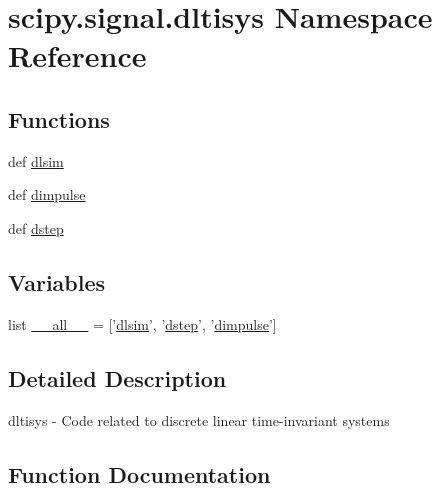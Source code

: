 \hypertarget{namespacescipy_1_1signal_1_1dltisys}{}\section{scipy.\+signal.\+dltisys Namespace Reference}
\label{namespacescipy_1_1signal_1_1dltisys}
\subsection*{Functions}
\begin{DoxyCompactItemize}
\item 
def \hyperlink{namespacescipy_1_1signal_1_1dltisys_a7ec6c434ab1ddd8dc46d5f23c2ccb86e}{dlsim}
\item 
def \hyperlink{namespacescipy_1_1signal_1_1dltisys_aaebde1dfe31a291a9775fef5bd0cb59c}{dimpulse}
\item 
def \hyperlink{namespacescipy_1_1signal_1_1dltisys_a9739d458ecd56f2bfe9e16fc781ff7bb}{dstep}
\end{DoxyCompactItemize}
\subsection*{Variables}
\begin{DoxyCompactItemize}
\item 
list \hyperlink{namespacescipy_1_1signal_1_1dltisys_a1b54a342c8a5a451dafb8f1bd61488ec}{\+\_\+\+\_\+all\+\_\+\+\_\+} = \mbox{[}'\hyperlink{namespacescipy_1_1signal_1_1dltisys_a7ec6c434ab1ddd8dc46d5f23c2ccb86e}{dlsim}', '\hyperlink{namespacescipy_1_1signal_1_1dltisys_a9739d458ecd56f2bfe9e16fc781ff7bb}{dstep}', '\hyperlink{namespacescipy_1_1signal_1_1dltisys_aaebde1dfe31a291a9775fef5bd0cb59c}{dimpulse}'\mbox{]}
\end{DoxyCompactItemize}


\subsection{Detailed Description}
\begin{DoxyVerb}dltisys - Code related to discrete linear time-invariant systems
\end{DoxyVerb}
 

\subsection{Function Documentation}
\hypertarget{namespacescipy_1_1signal_1_1dltisys_aaebde1dfe31a291a9775fef5bd0cb59c}{}
